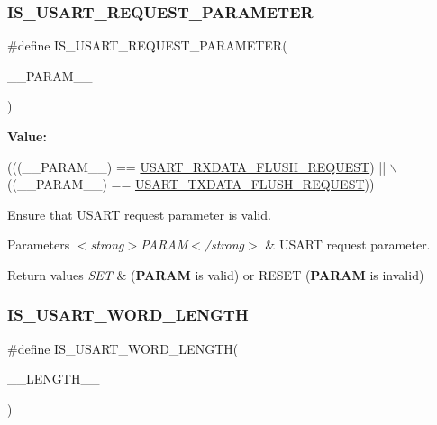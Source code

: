 \subsubsection{\texorpdfstring{I\+S\+\_\+\+U\+S\+A\+R\+T\+\_\+\+R\+E\+Q\+U\+E\+S\+T\+\_\+\+P\+A\+R\+A\+M\+E\+T\+ER}{IS\_USART\_REQUEST\_PARAMETER}}
{\footnotesize\ttfamily \#define I\+S\+\_\+\+U\+S\+A\+R\+T\+\_\+\+R\+E\+Q\+U\+E\+S\+T\+\_\+\+P\+A\+R\+A\+M\+E\+T\+ER(\begin{DoxyParamCaption}\item[{}]{\+\_\+\+\_\+\+P\+A\+R\+A\+M\+\_\+\+\_\+ }\end{DoxyParamCaption})}

{\bfseries Value\+:}
\begin{DoxyCode}
(((\_\_PARAM\_\_) == \hyperlink{group___u_s_a_r_t___request___parameters_ga3d08169bc6516ef929b161f47ecba555}{USART\_RXDATA\_FLUSH\_REQUEST}) || \(\backslash\)
                                               ((\_\_PARAM\_\_) == 
      \hyperlink{group___u_s_a_r_t___request___parameters_ga5d3de7b3c6b8f2691dc6ddae10c2355d}{USART\_TXDATA\_FLUSH\_REQUEST}))
\end{DoxyCode}


Ensure that U\+S\+A\+RT request parameter is valid. 


\begin{DoxyParams}{Parameters}
{\em $<$strong$>$\+P\+A\+R\+A\+M$<$/strong$>$} & U\+S\+A\+RT request parameter. \\
\hline
\end{DoxyParams}

\begin{DoxyRetVals}{Return values}
{\em S\+ET} & ({\bfseries P\+A\+R\+AM} is valid) or R\+E\+S\+ET ({\bfseries P\+A\+R\+AM} is invalid) \\
\hline
\end{DoxyRetVals}
\mbox{\label{group___u_s_a_r_t_ex___private___macros_ga8cacb83de23342eddca6ad3d07f56e5c}} 
\subsubsection{\texorpdfstring{I\+S\+\_\+\+U\+S\+A\+R\+T\+\_\+\+W\+O\+R\+D\+\_\+\+L\+E\+N\+G\+TH}{IS\_USART\_WORD\_LENGTH}}
{\footnotesize\ttfamily \#define I\+S\+\_\+\+U\+S\+A\+R\+T\+\_\+\+W\+O\+R\+D\+\_\+\+L\+E\+N\+G\+TH(\begin{DoxyParamCaption}\item[{}]{\+\_\+\+\_\+\+L\+E\+N\+G\+T\+H\+\_\+\+\_\+ }\end{DoxyParamCaption})}

